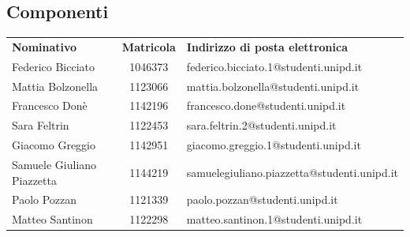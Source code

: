 \subsection{Componenti}
\begin{table}[H]
	\centering\renewcommand{\arraystretch}{1.5}
	
	\begin{tabular}{l c l}
		
		
		\rowcolorhead 
		{ \textbf{Nominativo}} &
		{ \textbf{Matricola}} &
		{ \textbf{Indirizzo di posta elettronica}}  \\
		
		\rowcolorlight
		Federico Bicciato & 1046373 & federico.bicciato.1@studenti.unipd.it  \\ 
		\rowcolordark
		Mattia Bolzonella & 1123066 & mattia.bolzonella@studenti.unipd.it  \\ 
		\rowcolorlight
		Francesco Donè & 1142196 & francesco.done@studenti.unipd.it  \\ 
		\rowcolordark
		Sara Feltrin & 1122453 &  sara.feltrin.2@studenti.unipd.it \\ 
		\rowcolorlight
		Giacomo Greggio & 1142951 & giacomo.greggio.1@studenti.unipd.it  \\ 
		
		\rowcolordark
		Samuele Giuliano Piazzetta & 1144219  & samuelegiuliano.piazzetta@studenti.unipd.it  \\ 
		\rowcolorlight
		Paolo Pozzan & 1121339  &  paolo.pozzan@studenti.unipd.it  \\ 
		\rowcolordark
		Matteo Santinon & 1122298 &  matteo.santinon.1@studenti.unipd.it \\ 
	\end{tabular}
\end{table}

